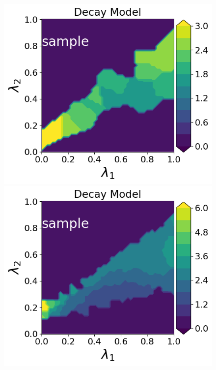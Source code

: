 \begin{figure}[h]
\begin{minipage}{.4\textwidth}
\includegraphics[width=\linewidth]{examples/fig_decay_q1/DecayModel--sample_N50_mc.png}
\includegraphics[width=\linewidth]{examples/fig_decay_q1/DecayModel--sample_N500_mc.png}


\end{minipage}
\end{figure}
